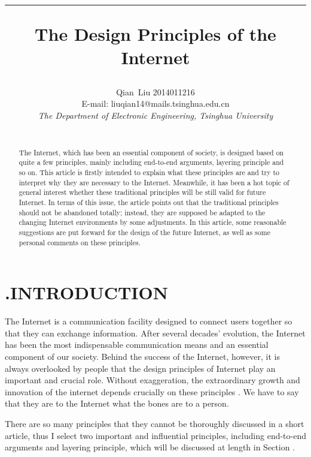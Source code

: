 \documentclass[11pt,twocolumn]{article}
\begin{document}
\title{\rule{\textwidth}{0.5mm} \textbf{The Design Principles of the Internet}}

\author{Qian~Liu \hspace{2em} 2014011216 \\ E-mail: liuqian14@mails.tsinghua.edu.cn \\\emph{The Department of Electronic Engineering, Tsinghua University} \\ \rule{\textwidth}{0.5mm}}
\date{}
\maketitle

\begin{abstract}
The Internet, which has been an essential component of society, is designed based on quite a few principles, mainly including end-to-end arguments, layering principle and so on. This article is firstly intended to explain what these principles are and try to interpret why they are necessary to the Internet. Meanwhile, it has been a hot topic of general interest whether these traditional principles will be still valid for future Internet. In terms of this issue, the article points out that the traditional principles should not be abandoned totally; instead, they are supposed be adapted to the changing Internet environments by some adjustments.  In this article, some reasonable suggestions are put forward for the design of the future Internet, as well as some personal comments on these principles.
\end{abstract}

\section*{\textbf{\uppercase\expandafter{}.\quad INTRODUCTION}}
The Internet is a communication facility designed to connect users together so that they can exchange information. After several decades' evolution, the Internet has been the most indispensable communication means and an essential component of our society. Behind the success of the Internet, however, it is always overlooked by people that the design principles of Internet play an important and crucial role. Without exaggeration, the extraordinary growth and innovation of the internet depends crucially on these principles \cite{Carpenter}. We have to say that they are to the Internet what the bones are to a person. 

There are so many principles that they cannot be thoroughly discussed in a short article, thus I select two important and influential principles, including end-to-end arguments and layering principle, which will be discussed at length in Section \uppercase\expandafter{}.
\end{document}

